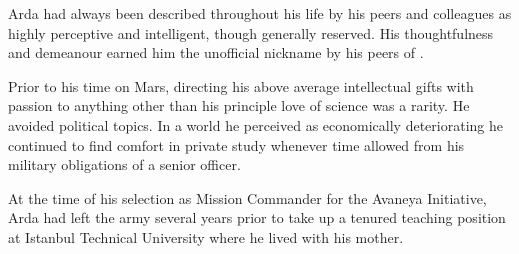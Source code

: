 Arda had always been described throughout his life by his peers and colleagues as highly perceptive and intelligent, though generally reserved. His thoughtfulness and demeanour earned him the unofficial nickname by his peers of .

Prior to his time on Mars, directing his above average intellectual gifts with passion to anything other than his principle love of science was a rarity. He avoided political topics. In a world he perceived as economically deteriorating he continued to find comfort in private study whenever time allowed from his military obligations of a senior officer.

At the time of his selection as Mission Commander for the Avaneya Initiative, Arda had left the army several years prior to take up a tenured teaching position at Istanbul Technical University where he lived with his mother.

